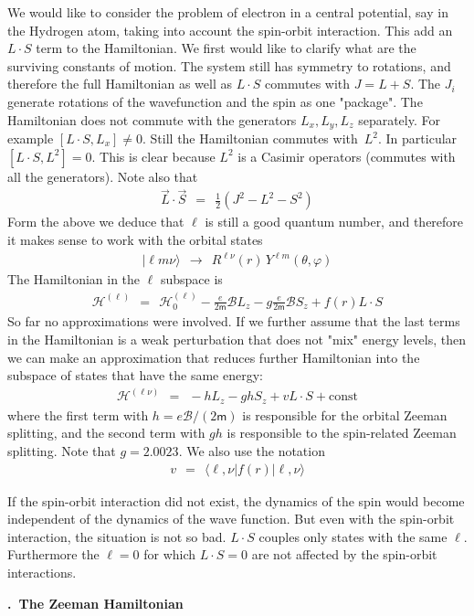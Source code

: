 \documentclass[onecolumn,fleqn, 11pt]{revtex4}
\newcommand{\mass}{\mathsf{m}}
\newcommand{\beq}{\begin{eqnarray}}
\newcommand{\eeq}{\end{eqnarray}}
\renewcommand{\thesubsection}{\arabic{subsection}}
\renewcommand{\thesubsubsection}{\arabic{subsubsection}}
\newcommand{\sheadC}[1]
{
\addtocounter{subsubsection}{1}
\vspace{5mm}
{\bf \thesubsection.\thesubsubsection \ #1}  
\nopagebreak
\phantomsection
}
\begin{document}
We would like to consider the problem of electron in a central potential, 
say in the Hydrogen atom, taking into account the spin-orbit interaction.
This add an $L\cdot S$ term to the Hamiltonian. 
We first would like to clarify what are the surviving constants of motion.
The system still has symmetry to rotations, 
and therefore the full Hamiltonian as well as $L\cdot S$ 
commutes with ${J=L+S}$. The $J_i$ generate rotations 
of the wavefunction and the spin as one "package".  
The Hamiltonian does not commute with the generators 
${L_x,L_y,L_z}$ separately. For example ${[L \cdot S,L_x] \neq 0}$.
Still the Hamiltonian commutes with~$L^2$. 
In particular ${[L \cdot S,L^2]=0}$. This is clear 
because $L^2$ is a Casimir operators (commutes with all the generators).    
Note also that  
\beq
\vec{L} \cdot \vec{S} \ \ = \ \ \frac{1}{2} \left (J^2 - L^2 - S^2 \right ) 
\eeq
Form the above we deduce that $\ell$ is still a good quantum number, 
and therefore it makes sense to work with the orbital states  
\beq
|\ell m \nu \rangle \ \ \rightarrow \ \ R^{\ell\nu}(r) \, Y^{\ell m}(\theta,\varphi) 
\eeq
The Hamiltonian in the $\ell$ subspace is 
\beq
\mathcal{H}^{(\ell)} 
\ \ = \ \ \mathcal{H}_0^{(\ell)} 
- \frac{e}{2\mass} \mathcal{B} L_z 
- g\frac{e}{2\mass}\mathcal{B} S_z 
+ f(r) L\cdot S 
\eeq
So far no approximations were involved. 
If we further assume that the last terms in the Hamiltonian 
is a weak perturbation that does not "mix" energy levels, 
then we can make an approximation that reduces further Hamiltonian 
into the subspace of states that have the same energy:
\beq
\mathcal{H}^{(\ell\nu)} \ \ = \ \ -h L_z - g h S_z + v L \cdot S +\mbox{const} 
\eeq
where the first term with ${h=e\mathcal{B}/(2\mass)}$ 
is responsible for the orbital Zeeman splitting,  
and the second term with ${gh}$ is responsible 
to the spin-related Zeeman splitting. 
Note that $g=2.0023$. We also use the notation  
\beq
v \ \ = \ \ \langle \ell, \nu | f(r) | \ell, \nu \rangle 
\eeq


If the spin-orbit interaction did not exist, the dynamics 
of the spin would become independent of the dynamics 
of the wave function. But even with the spin-orbit 
interaction, the situation is not so bad. ${L \cdot S}$ couples 
only states with the same ${\ell}$. 
Furthermore the ${\ell=0}$ for which ${L \cdot S=0}$
are not affected by the spin-orbit interactions. 


\sheadC{The Zeeman Hamiltonian}
\end{document}

